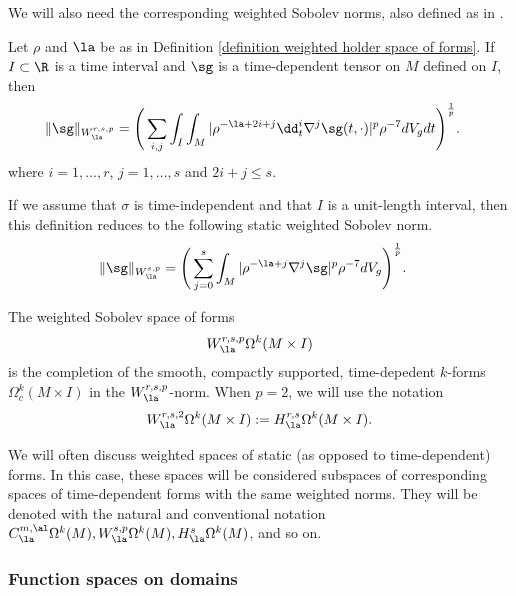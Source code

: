 \documentclass[hidelinks, 12pt, oneside, reqno]{amsart}
\begin{document}
We will also need the corresponding weighted Sobolev norms, also defined as in \cite[\S 7]{LMCFwithsings}.

\begin{defn}\label{definition weighted parabolic sobolev norms}
    Let $\rho$ and $\la$ be as in Definition \ref{definition weighted holder space of forms}. If $I\subset \R$ is a time interval and $\sg$ is a time-dependent tensor on $M$ defined on $I$, then
    \begin{align}\label{equation weighted parabolic sobolev definition}
        \|\sg\|_{W^{r,s,p}_{\la}} &= \Bigg( \sum_{i,j} \int_I \int_M |\rho^{-\la + 2i + j}\dd_t^i \nabla^j \sg(t,\cdot)|^p \rho^{-7} dV_g dt \Bigg)^\frac{1}{p}.
    \end{align}
    where $i = 1, \ldots, r$, $j = 1, \ldots, s$ and $2i + j \le s$. 
\end{defn}

\begin{rmk}
    If we assume that $\sigma$ is time-independent and that $I$ is a unit-length interval, then this definition reduces to the following static weighted Sobolev norm.
\begin{align}\label{equation weighted static sobolev definition}
        \|\sg\|_{W^{s,p}_{\la}} &= \Bigg( \sum_{j=0}^s \int_M |\rho^{-\la + j} \nabla^j \sg|^p \rho^{-7} dV_g \Bigg)^\frac{1}{p}.
    \end{align}
\end{rmk}

\begin{defn}\label{definition weighted sobolev space of forms}
The weighted Sobolev space of forms
\[
W^{r,s,p}_{\la}\Omega^k(M \times I) 
\]
is the completion of the smooth, compactly supported, time-depedent $k$-forms $\Omega^k_c(M \times I)$ in the $W^{r,s,p}_\la$-norm. When $p = 2$, we will use the notation
\[
W^{r,s,2}_{\la}\Omega^k(M \times I) := H^{r,s}_{\la}\Omega^k(M \times I).
\] 
\end{defn}

\begin{rmk}
    We will often discuss weighted spaces of static (as opposed to time-dependent) forms. In this case, these spaces will be considered subspaces of corresponding spaces of time-dependent forms with the same weighted norms. They will be denoted with the natural and conventional notation $C^{m,\al}_\la\Omega^k(M), W^{s,p}_{\la}\Omega^k(M), H^{s}_{\la}\Omega^k(M)$, and so on.
\end{rmk}


\subsubsection{Function spaces on domains}\label{section function spaces domains}
\end{document}
